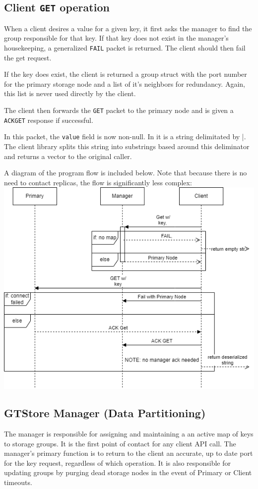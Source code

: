 \documentclass{article}
\begin{document}
\pagebreak
\subsection{Client \texttt{GET} operation}
When a client desires a value for a given key, it first asks the manager to find the group responsible for that key.
If that key does not exist in the manager's housekeeping, a generalized \texttt{FAIL} packet is returned. The client should then fail the get request.

If the key does exist, the client is returned a group struct with the port number for the primary storage node and a list of it's neighbors for redundancy. 
Again, this list is never used directly by the client.

The client then forwards the \texttt{GET} packet to the primary node and is given a \texttt{ACKGET} response if successful.

In this packet, the \texttt{value} field is now non-null. 
In it is a string delimitated by |. 
The client library splits this string into substrings based around this deliminator and returns a vector to the original caller.

A diagram of the program flow is included below. Note that because there is no need to contact replicas, 
the flow is significantly less complex:\\
\includegraphics[width=\linewidth]{img/Get.drawio.png}


\subsection{GTStore Manager (Data Partitioning)}
The manager is responsible for assigning and maintaining a an active map of keys to storage groups. It is the first point of contact for any client API call.
The manager's primary function is to return to the client an accurate, up to date port for the key request, regardless of which operation. It is also responsible for updating
groups by purging dead storage nodes in the event of Primary or Client timeouts.
\end{document}
